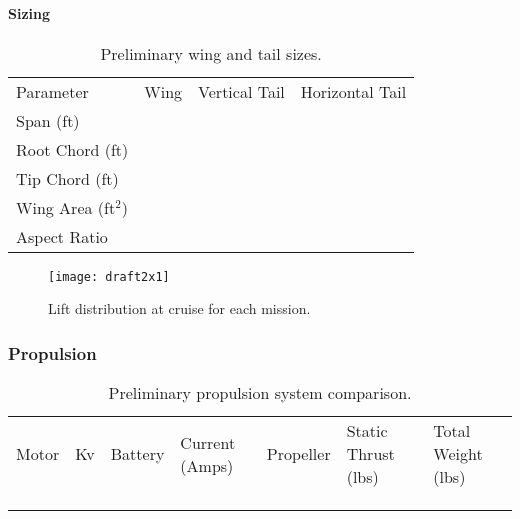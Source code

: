 \paragraph{Sizing}


\begin{table}[h!]
	\centering
	\caption{Preliminary wing and tail sizes.}
	\label{tab:prelimwingsize}
	\begin{tabular}{ C{1in}  C{1in}  C{1in}  C{1in}}
		
		Parameter & Wing & Vertical Tail & Horizontal Tail \\
		
		Span (ft) & & &\\
		
		Root Chord (ft) & & &\\
		
		Tip Chord (ft) & & &\\
		
		Wing Area (ft\(^2\)) & & &\\
		
		Aspect Ratio & & &\\
		
	\end{tabular}
\end{table}


\begin{figure}[h!]
	\centering
	\texttt{[image: draft2x1]}
	\caption{Lift distribution at cruise for each mission.}
	\label{fig:prelimliftdist}
\end{figure}

\subsubsection{Propulsion}

\begin{table}[h!]
	\centering
	\caption{Preliminary propulsion system comparison.}
	\label{tab:prelimpropselection}
	\begin{tabular}{ C{1in}  C{0.25in}  C{1in}  C{0.5in}  C{0.75in}  C{0.75in}  C{0.75in}}
		
		Motor & Kv & Battery & Current (Amps) & Propeller & Static Thrust (lbs) & Total Weight (lbs) \\
		
		& & & & & & \\
		
		& & & & & & \\
		
		& & & & & & \\
		
	\end{tabular}
\end{table}


